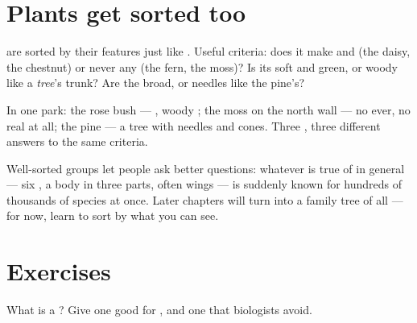 \section{Plants get sorted too}

\begin{proposition}\label{prop:g3:sorting-living-things:plants}
 are sorted by their features just like . Useful
criteria: does it make \emph{} and  (the daisy, the
chestnut) or never any (the fern, the moss)? Is its  soft and
green, or woody like a \emph{tree}'s trunk? Are the  broad,
or needles like the pine's?
\end{proposition}
\admitted

\begin{example}\label{ex:g3:sorting-living-things:park}
In one park: the rose bush --- , woody ; the moss on
the north wall --- no  ever, no real  at all; the pine
--- a tree with needles and cones. Three , three different
answers to the same criteria.
\end{example}

\begin{remark}\label{rem:g3:sorting-living-things:science}
Well-sorted groups let people ask better questions: whatever is
true of  in general --- six , a body in three parts,
often wings --- is suddenly known for hundreds of thousands of
species at once. Later chapters will turn  into a family
tree of all  --- for now, learn to sort by what you
can see.
\end{remark}

\section{Exercises}

\begin{exercise}[$\star$]\label{exo:g3:sorting-living-things:1}
What is a ? Give one good  for  ,
and one that biologists avoid.
\end{exercise}

